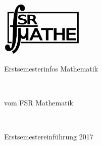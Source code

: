 \documentclass{scrartcl}
\begin{document}
%
%
%
\newcommand{\keyword}{\textbf}
\newcommand{\todo}[1]{\marginpar{TODO\\#1}}
\newpage
{ %
  \begin{flushright}
    \includegraphics[width=0.3\textwidth]{./fsrlogos/bw_1024.png}
  \end{flushright}
  \begin{center}
    \begin{huge}
      Erstsemesterinfos Mathematik
    \end{huge}\\\bigskip
    \begin{Large}
      vom FSR Mathematik
    \end{Large}\\\vspace{1em}
    \begin{huge}
      Erstsemestereinführung 2017
    \end{huge}


\end{center}}
\end{document}
